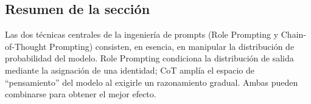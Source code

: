 \subsection{Resumen de la sección}

Las dos técnicas centrales de la ingeniería de prompts (Role Prompting y Chain-of-Thought Prompting) consisten, en esencia, en manipular la distribución de probabilidad del modelo. Role Prompting condiciona la distribución de salida mediante la asignación de una identidad; CoT amplía el espacio de ``pensamiento'' del modelo al exigirle un razonamiento gradual. Ambas pueden combinarse para obtener el mejor efecto.

